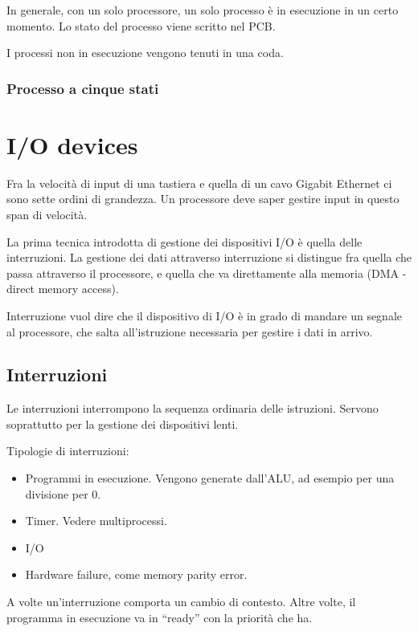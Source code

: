 In generale, con un solo processore, un solo processo \`e in esecuzione in un certo momento. Lo stato del processo viene scritto nel PCB.

I processi non in esecuzione vengono tenuti in una coda.

\subsubsection{Processo a cinque stati}


\section{I/O devices}

Fra la velocit\`a di input di una tastiera e quella di un cavo Gigabit Ethernet ci sono sette ordini di grandezza. Un processore deve saper gestire input in questo span di velocit\`a.

La prima tecnica introdotta di gestione dei dispositivi I/O \`e quella delle interruzioni. La gestione dei dati attraverso interruzione si distingue fra quella che passa attraverso il processore, e quella che va direttamente alla memoria (DMA - direct memory access).

Interruzione vuol dire che il dispositivo di I/O \`e in grado di mandare un segnale al processore, che salta all'istruzione necessaria per gestire i dati in arrivo.

\subsection{Interruzioni}

Le interruzioni interrompono la sequenza ordinaria delle istruzioni. Servono soprattutto per la gestione dei dispositivi lenti.

Tipologie di interruzioni:
\begin{itemize}
  \item Programmi in esecuzione. Vengono generate dall'ALU, ad esempio per una divisione per 0.
  \item Timer. Vedere multiprocessi.
  \item I/O
  \item Hardware failure, come memory parity error.
\end{itemize}

A volte un'interruzione comporta un cambio di contesto. Altre volte, il programma in esecuzione va in ``ready'' con la priorit\`a che ha.

